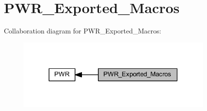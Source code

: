 \hypertarget{group___p_w_r___exported___macros}{}\section{P\+W\+R\+\_\+\+Exported\+\_\+\+Macros}
\label{group___p_w_r___exported___macros}
Collaboration diagram for P\+W\+R\+\_\+\+Exported\+\_\+\+Macros\+:
\nopagebreak
\begin{figure}[H]
\begin{center}
\leavevmode
\includegraphics[width=278pt]{group___p_w_r___exported___macros}
\end{center}
\end{figure}
